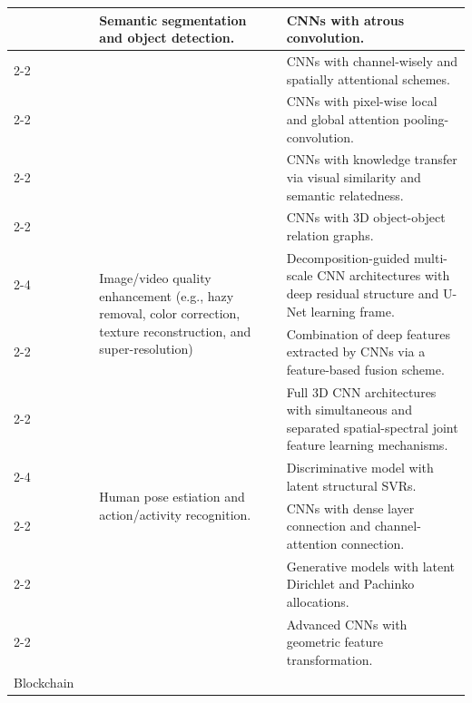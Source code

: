 \documentclass[journal]{IEEEtran}
\begin{document}
\begin{table}[ht!]
\begin{tabular}{|p{2.10cm}|p{0.75cm}|p{5.75cm}|p{7.85cm}|}
	
& \cite{chen2018deeplab}	& \multirow{2}{5.75cm}{Semantic segmentation and object detection.} & 	CNNs with atrous convolution. \\ \cline{2-2} \cline{4-4}
& \cite{hua2020cross}		& & CNNs with channel-wisely and spatially attentional schemes. \\ \cline{2-2} \cline{4-4}
& \cite{liu2020picanet}		& & CNNs with pixel-wise local and global attention pooling-convolution.\\\cline{2-2} \cline{4-4}
& \cite{tang2018visual}		& & CNNs with knowledge transfer via visual similarity and semantic relatedness.\\\cline{2-2} \cline{4-4}
& \cite{feng2021relation}		& & CNNs with 3D object-object relation graphs. \\ \cline{2-4}

& \cite{yeh2019multi}	& \multirow{2}{5.75cm}{Image/video quality enhancement (e.g., hazy removal, color correction, texture reconstruction, and super-resolution)} & 	Decomposition-guided multi-scale CNN architectures with deep residual structure and U-Net learning frame.\\ \cline{2-2} \cline{4-4}
& \cite{wang2020improved}		& & Combination of deep features extracted by CNNs via a feature-based fusion scheme.\\ \cline{2-2} \cline{4-4}
& \cite{mei2020spatial}		& & Full 3D CNN architectures with simultaneous and separated spatial-spectral joint feature learning mechanisms.\\ \cline{2-4}

& \cite{chen2011human}	& \multirow{2}{5.75cm}{Human pose estiation and action/activity recognition.}	& Discriminative model with latent structural SVRs. \\ \cline{2-2} \cline{4-4}
& \cite{rogez2019lcr}		& & CNNs with dense layer connection and channel-attention connection.\\ \cline{2-2} \cline{4-4}
& \cite{huynh2018hierarchical}		& & Generative models with latent Dirichlet and Pachinko allocations.\\ \cline{2-2} \cline{4-4}
& \cite{huynh2020encoding}		& & Advanced CNNs with geometric feature transformation. 
\\  \hline\hline
  
Blockchain 


\end{tabular}
\end{table}
\end{document}
